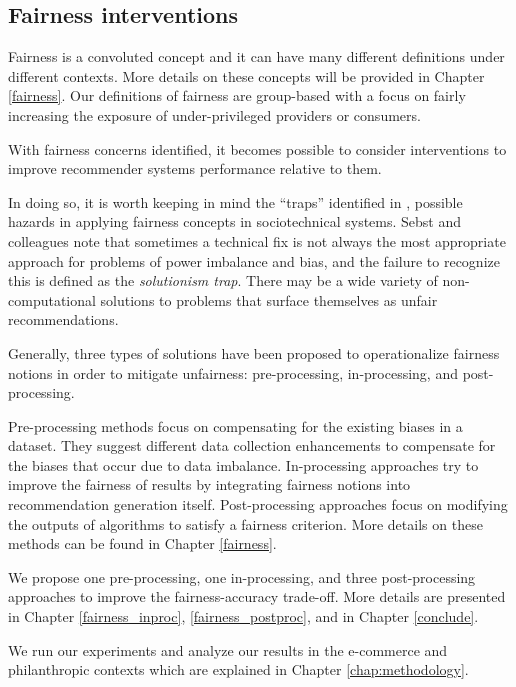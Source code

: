 \subsection{Fairness interventions}

Fairness is a convoluted concept and it can have many different definitions under different contexts. More details on these concepts will be provided in Chapter \ref{fairness}. Our definitions of fairness are group-based with a focus on fairly increasing the exposure of under-privileged providers or consumers. 

With fairness concerns identified, it becomes possible to consider interventions to improve recommender systems performance relative to them. 

In doing so, it is worth keeping in mind the ``traps'' identified in \cite{selbst2019fairness}, possible hazards in applying fairness concepts in sociotechnical systems. Sebst and colleagues note that sometimes a technical fix is not always the most appropriate approach for problems of power imbalance and bias, and the failure to recognize this is defined as the \textit{solutionism trap}. There may be a wide variety of non-computational solutions to problems that surface themselves as unfair recommendations. 

Generally, three types of solutions have been proposed to operationalize fairness notions in order to mitigate  unfairness: pre-processing, in-processing, and post-processing.

Pre-processing methods focus on compensating for the existing biases in a dataset. They suggest different data collection enhancements to compensate for the biases that occur due to data imbalance. In-processing approaches try to improve the fairness of results by integrating fairness notions into recommendation generation itself. Post-processing approaches focus on modifying the outputs of algorithms to satisfy a fairness criterion. More details on these methods can be found in Chapter \ref{fairness}.

We propose one pre-processing, one in-processing, and three post-processing approaches to improve the fairness-accuracy trade-off. More details are presented in Chapter \ref{fairness_inproc}, \ref{fairness_postproc}, and in Chapter \ref{conclude}.


We run our experiments and analyze our results in the e-commerce and philanthropic contexts which are explained in Chapter \ref{chap:methodology}.


